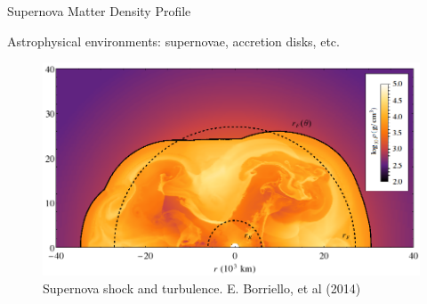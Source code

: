 \begin{frame}{Supernova Matter Density Profile}

\begin{tcolorbox}%

Astrophysical environments: supernovae, accretion disks, etc.

\end{tcolorbox}

\begin{figure}
    \centering
    \includegraphics[height=0.5\textheight]{assets/supernova-shock-turbulence.png}
    \caption*{Supernova shock and turbulence. E. Borriello, et al  (2014)}
\end{figure}



\end{frame}










